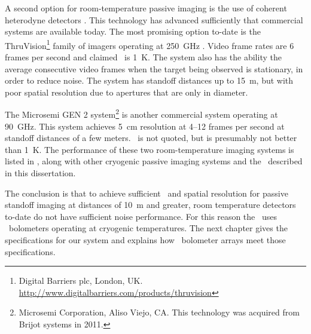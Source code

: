 A second option for room-temperature passive imaging is the use of coherent heterodyne detectors \cite{rieke_detection_2003,rogalski_terahertz_2011}.
This technology has advanced sufficiently that commercial systems are available today.
The most promising option to-date is the ThruVision\footnote{Digital Barriers plc, London, UK. \url{http://www.digitalbarriers.com/products/thruvision}} family of imagers operating at \SI{250}{\GHz} \cite{mann_first_2009,digital_barriers_extra_????}.
Video frame rates are 6 frames per second and claimed \NETD\ is \SI{1}{\K}.
The system also has the ability the average consecutive video frames when the target being observed is stationary, in order to reduce noise.
The system has standoff distances up to \SI{15}{\m}, but with poor spatial resolution due to apertures that are only  in diameter.

The Microsemi GEN 2 system\footnote{%
Microsemi Corporation, Aliso Viejo, CA. This technology was acquired from Brijot systems in 2011.}
is another commercial system operating at \SI{90}{\GHz}.
This system achieves \SI{5}{\cm} resolution at 4--12 frames per second at standoff distances of a few meters.
\NETD\ is not quoted, but is presumably not better than \SI{1}{\K}.
The performance of these two room-temperature imaging systems is listed in , along with other cryogenic passive imaging systems and the \Imager\ described in this dissertation.

The conclusion is that to achieve sufficient \NETD\ and spatial resolution for passive standoff imaging at distances of \SI{10}{\m} and greater, room temperature detectors to-date do not have sufficient noise performance.
For this reason the \Imager\ uses \TES\ bolometers operating at cryogenic temperatures.
The next chapter gives the specifications for our system and explains how \TES\ bolometer arrays meet those specifications.
